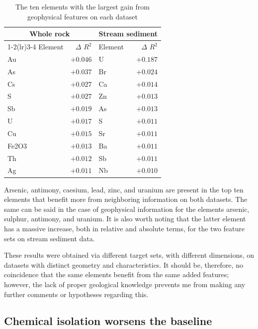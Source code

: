 \documentclass[
    a4paper,
    11pt,
    oneside,
    numbers=noendperiod,
    abstract=true
]{scrartcl}
\newcommand{\Rsq}{$R^2$}
\begin{document}
\begin{table}[htbp]
\centering
\caption[Elements with the largest geophysics gain]{The ten elements with the largest gain from
geophysical features on each dataset}
\label{tab:pathfinders2}
\begin{tabular}{lrlr}
\toprule
\multicolumn{2}{c}{Whole rock} & \multicolumn{2}{c}{Stream sediment} \\
\cmidrule(lr){1-2}\cmidrule(lr){3-4}
Element & $\Delta$ \Rsq{} & Element & $\Delta$ \Rsq{} \\
\midrule
  Au  & $+0.046$ & U   & $\mathbf{+0.187}$ \\
  As  & $+0.037$ & Br  & $+0.024$ \\
  Cs  & $+0.027$ & Ca  & $+0.014$ \\
  S   & $+0.027$ & Zn  & $+0.013$ \\
  Sb  & $+0.019$ & As  & $+0.013$ \\
  U   & $+0.017$ & S   & $+0.011$ \\
  Cu  & $+0.015$ & Sr  & $+0.011$ \\
  Fe2O3 & $+0.013$ & Ba  & $+0.011$ \\
  Th  & $+0.012$ & Sb  & $+0.011$ \\
  Ag  & $+0.011$ & Nb  & $+0.010$ \\
\bottomrule
\end{tabular}
\end{table}


Arsenic, antimony, caesium, lead, zinc, and uranium are present in the top ten elements that benefit more from neighboring information on both datasets. The same can be said in the case of geophysical information for the elements arsenic, sulphur, antimony, and uranium. 
It is also worth noting that the latter element has a massive increase, both in relative and absolute terms, for the two feature sets on stream sediment data.

These results were obtained via different target sets, with different dimensions, on datasets with distinct geometry and characteristics. It should be, therefore, no coincidence that the same elements benefit from the same added features; however, the lack of proper geological knowledge prevents me from making any further comments or hypotheses regarding this.

\subsection{Chemical isolation worsens the baseline}
\label{sec:isolation}
\end{document}
